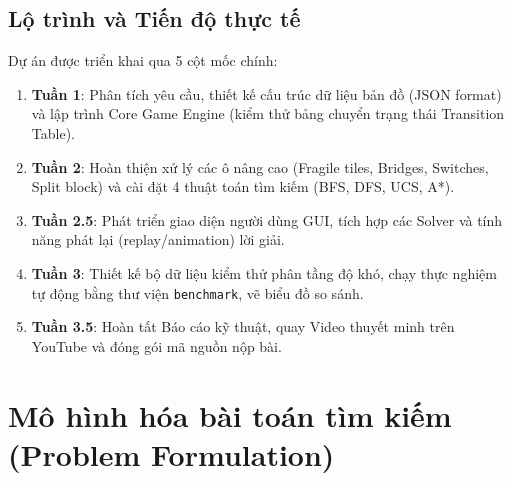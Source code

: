 \documentclass[12pt,a4paper]{article}
\begin{document}
\subsection{Lộ trình và Tiến độ thực tế}
Dự án được triển khai qua 5 cột mốc chính:
\begin{enumerate}
    \item \textbf{Tuần 1}: Phân tích yêu cầu, thiết kế cấu trúc dữ liệu bản đồ (JSON format) và lập trình Core Game Engine (kiểm thử bảng chuyển trạng thái Transition Table).
    \item \textbf{Tuần 2}: Hoàn thiện xử lý các ô nâng cao (Fragile tiles, Bridges, Switches, Split block) và cài đặt 4 thuật toán tìm kiếm (BFS, DFS, UCS, A*).
    \item \textbf{Tuần 2.5}: Phát triển giao diện người dùng GUI, tích hợp các Solver và tính năng phát lại (replay/animation) lời giải.
    \item \textbf{Tuần 3}: Thiết kế bộ dữ liệu kiểm thử phân tầng độ khó, chạy thực nghiệm tự động bằng thư viện \texttt{benchmark}, vẽ biểu đồ so sánh.
    \item \textbf{Tuần 3.5}: Hoàn tất Báo cáo kỹ thuật, quay Video thuyết minh trên YouTube và đóng gói mã nguồn nộp bài.
\end{enumerate}

\section{Mô hình hóa bài toán tìm kiếm (Problem Formulation)}
\end{document}
